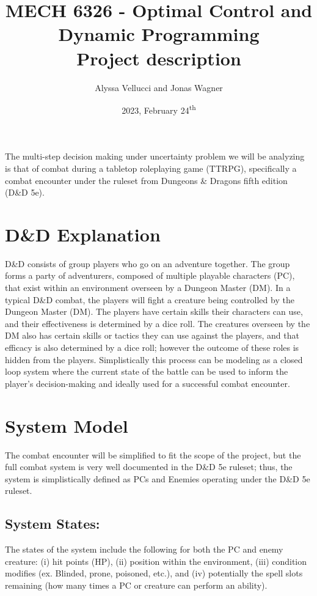 \documentclass[]{article}
\title{
    MECH 6326 - Optimal Control and Dynamic Programming \\ 
    Project description
}
\author{Alyssa Vellucci and Jonas Wagner}
\date{2023, February 24\textsuperscript{th}}
\begin{document}
\maketitle


The multi-step decision making under uncertainty problem we will be analyzing is that of combat during a tabletop roleplaying game (TTRPG), specifically a combat encounter under the ruleset from Dungeons \& Dragons fifth edition (D\&D 5e).

\section*{D\&D Explanation}
D\&D consists of group players who go on an adventure together.
The group forms a party of adventurers, composed of multiple playable characters (PC), that exist within an environment overseen by a Dungeon Master (DM).
In a typical D\&D combat, the players will fight a creature being controlled by the Dungeon Master (DM). 
The players have certain skills their characters can use, and their effectiveness is determined by a dice roll. 
The creatures overseen by the DM also has certain skills or tactics they can use against the players, and that efficacy is also determined by a dice roll; however the outcome of these roles is hidden from the players. 
Simplistically this process can be modeling as a closed loop system where the current state of the battle can be used to inform the player’s decision-making and ideally used for a successful combat encounter.

\section*{System Model}
The combat encounter will be simplified to fit the scope of the project, but the full combat system is very well documented in the D\&D 5e ruleset; thus, the system is simplistically defined as PCs and Enemies operating under the D\&D 5e ruleset.

\subsection*{System States:}
The states of the system include the following for both the PC and enemy creature: 
(i) hit points (HP), 
(ii) position within the environment, 
(iii) condition modifies (ex. Blinded, prone, poisoned, etc.),
and (iv) potentially the spell slots remaining (how many times a PC or creature can perform an ability).
\end{document}
